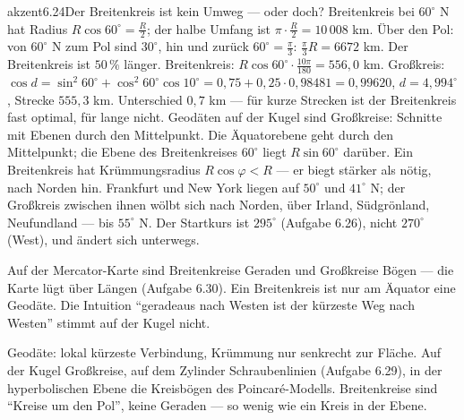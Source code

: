 \begin{loesungkarte}{akzent}{6.24}{Der Breitenkreis ist kein Umweg --- oder doch?}
Breitenkreis bei $60^{\circ}$ N hat Radius $R\cos60^{\circ} = \frac R2$; der halbe Umfang ist $\pi\cdot\frac R2 = 10\,008$ km. Über den Pol: von $60^{\circ}$ N zum Pol sind $30^{\circ}$, hin und zurück $60^{\circ} = \frac\pi3$: $\frac\pi3R = 6672$ km. Der Breitenkreis ist $50\,\%$ länger.
Breitenkreis: $R\cos60^{\circ}\cdot\frac{10\pi}{180} = 556{,}0$ km. Großkreis: $\cos d = \sin^{2}60^{\circ} + \cos^{2}60^{\circ}\cos10^{\circ} = 0{,}75 + 0{,}25\cdot0{,}98481 = 0{,}99620$, $d = 4{,}994^{\circ}$, Strecke $555{,}3$ km. Unterschied $0{,}7$ km --- für kurze Strecken ist der Breitenkreis fast optimal, für lange nicht.
Geodäten auf der Kugel sind Großkreise: Schnitte mit Ebenen durch den Mittelpunkt. Die Äquatorebene geht durch den Mittelpunkt; die Ebene des Breitenkreises $60^{\circ}$ liegt $R\sin60^{\circ}$ darüber. Ein Breitenkreis hat Krümmungsradius $R\cos\varphi < R$ --- er biegt stärker als nötig, nach Norden hin.
Frankfurt und New York liegen auf $50^{\circ}$ und $41^{\circ}$ N; der Großkreis zwischen ihnen wölbt sich nach Norden, über Irland, Südgrönland, Neufundland --- bis $55^{\circ}$ N. Der Startkurs ist $295^{\circ}$ (Aufgabe 6.26), nicht $270^{\circ}$ (West), und ändert sich unterwegs.
\begin{fehler}\kastentext
Auf der Mercator-Karte sind Breitenkreise Geraden und Großkreise Bögen --- die Karte lügt über Längen (Aufgabe 6.30). Ein Breitenkreis ist nur am Äquator eine Geodäte. Die Intuition \enquote{geradeaus nach Westen ist der kürzeste Weg nach Westen} stimmt auf der Kugel nicht.
\end{fehler}
\begin{mitnehmen}\kastentext
Geodäte: lokal kürzeste Verbindung, Krümmung nur senkrecht zur Fläche. Auf der Kugel Großkreise, auf dem Zylinder Schraubenlinien (Aufgabe 6.29), in der hyperbolischen Ebene die Kreisbögen des Poincaré-Modells. Breitenkreise sind \enquote{Kreise um den Pol}, keine Geraden --- so wenig wie ein Kreis in der Ebene.
\end{mitnehmen}
\end{loesungkarte}

